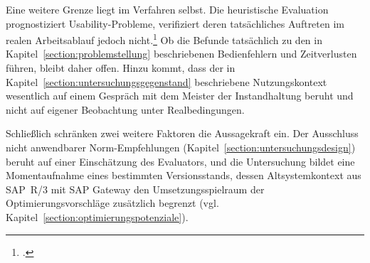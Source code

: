Eine weitere Grenze liegt im Verfahren selbst. Die heuristische Evaluation prognostiziert
Usability-Probleme, verifiziert deren tatsächliches Auftreten im realen Arbeitsablauf jedoch
nicht.\footcite[Vgl.][S.~254 f.]{nielsen1990heuristic} Ob die Befunde tatsächlich zu den in
Kapitel~\ref{section:problemstellung} beschriebenen Bedienfehlern und Zeitverlusten führen,
bleibt daher offen. Hinzu kommt, dass der in Kapitel~\ref{section:untersuchungsgegenstand}
beschriebene Nutzungskontext wesentlich auf einem Gespräch mit dem Meister der Instandhaltung
beruht und nicht auf eigener Beobachtung unter Realbedingungen.

Schließlich schränken zwei weitere Faktoren die Aussagekraft ein. Der Ausschluss nicht
anwendbarer Norm-Empfehlungen (Kapitel~\ref{section:untersuchungsdesign}) beruht auf einer
Einschätzung des Evaluators, und die Untersuchung bildet eine Momentaufnahme eines bestimmten
Versionsstands, dessen Altsystemkontext aus SAP~R/3 mit SAP Gateway den Umsetzungsspielraum der
Optimierungsvorschläge zusätzlich begrenzt (vgl. Kapitel~\ref{section:optimierungspotenziale}).